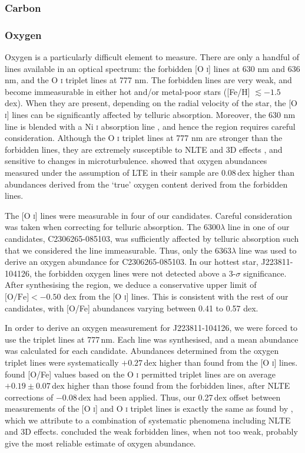 \documentclass{emulateapj}
\begin{document}
\subsubsection{Carbon}

\subsubsection{Oxygen}
\label{sec:oxygen-abundances}
Oxygen is a particularly difficult element to measure. There are only a handful of lines available in an optical spectrum: the forbidden [O \textsc{i}] lines at 630 nm and 636 nm, and the O \textsc{i} triplet lines at 777 nm. The forbidden lines are very weak, and become immeasurable in either hot and/or metal-poor stars ([Fe/H] $\lesssim -1.5$ dex). When they are present, depending on the radial velocity of the star, the [O \textsc{i}] lines can be significantly affected by telluric absorption. Moreover, the 630 nm line is blended with a Ni \textsc{i} absorption line \citep{allende-prieto;et-al_2001}, and hence the region requires careful consideration. Although the O \textsc{i} triplet lines at 777 nm are stronger than the forbidden lines, they are extremely susceptible to NLTE and 3D effects \citep{asplund;perez_2001}, and sensitive to changes in microturbulence. \citet{perez;et-al_2006} showed that oxygen abundances measured under the assumption of LTE in their sample are 0.08\,dex higher than abundances derived from the `true' oxygen content derived from the forbidden lines.

The [O \textsc{i}] lines were measurable in four of our candidates. Careful consideration was taken when correcting for telluric absorption. The 6300$\lambda$ line in one of our candidates, C2306265-085103, was sufficiently affected by telluric absorption such that we considered the line immeasurable. Thus, only the 6363$\lambda$ line was used to derive an oxygen abundance for C2306265-085103. In our hottest star, J223811-104126, the forbidden oxygen lines were not detected above a 3-$\sigma$ significance. After synthesising the region, we deduce a conservative upper limit of $\mbox{[O/Fe]} < -0.50$ dex from the [O \textsc{i}] lines. This is consistent with the rest of our candidates, with [O/Fe] abundances varying between 0.41 to 0.57 dex.

In order to derive an oxygen measurement for J223811-104126, we were forced to use the triplet lines at 777\,nm. Each line was synthesised, and a mean abundance was calculated for each candidate. Abundances determined from the oxygen triplet lines were systematically $+0.27$\,dex higher than found from the [O \textsc{i}] lines. \citet{perez;et-al_2006} found [O/Fe] values based on the O \textsc{i} permitted triplet lines are on average $+0.19 \pm 0.07$\,dex higher than those found from the forbidden lines, after NLTE corrections of $-$0.08\,dex had been applied.  Thus, our 0.27\,dex offset between measurements of the [O \textsc{i}] and O \textsc{i} triplet lines is exactly the same as found by \citet{perez;et-al_2006}, which we attribute to a combination of systematic phenomena including NLTE and 3D effects. \citet{perez;et-al_2006} concluded the weak forbidden lines, when not too weak, probably give the most reliable estimate of oxygen abundance.
\end{document}
